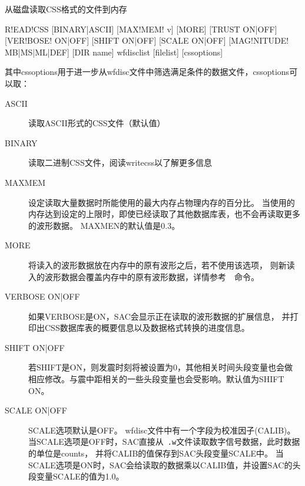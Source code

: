 \label{cmd:readcss}

从磁盘读取CSS格式的文件到内存

\begin{SACSTX}
R!EAD!CSS [BINARY|ASCII] [MAX!MEM! v] [MORE] [TRUST ON|OFF]
    [VER!BOSE! ON|OFF] [SHIFT ON|OFF] [SCALE ON|OFF]
    [MAG!NITUDE! MB|MS|ML|DEF] [DIR name] wfdisclist [filelist]
    [cssoptions]
\end{SACSTX}
其中cssoptions用于进一步从wfdisc文件中筛选满足条件的数据文件，cssoptions可以取：
\begin{SACSTX}
\end{SACSTX}

\begin{description}
\item [ASCII] 读取ASCII形式的CSS文件（默认值）
\item [BINARY] 读取二进制CSS文件，阅读writecss以了解更多信息
\item [MAXMEM] 设定读取大量数据时所能使用的最大内存占物理内存的百分比。
    当使用的内存达到设定的上限时，即使已经读取了其他数据库表，也不会再读取更多的波形数据。
    MAXMEN的默认值是0.3。
\item [MORE] 将读入的波形数据放在内存中的原有波形之后，若不使用该选项，
    则新读入的波形数据会覆盖内存中的原有波形数据，详情参考~~命令。
\item [VERBOSE ON|OFF] 如果VERBOSE是ON，SAC会显示正在读取的波形数据的扩展信息，
    并打印出CSS数据库表的概要信息以及数据格式转换的进度信息。
\item [SHIFT ON|OFF] 若SHIFT是ON，则发震时刻将被设置为0，其他相关时间头段变量也会做
    相应修改。与震中距相关的一些头段变量也会受影响。默认值为SHIFT ON。
\item [SCALE ON|OFF] SCALE选项默认是OFF。
    wfdisc文件中有一个字段为校准因子(CALIB)。
    当SCALE选项是OFF时，SAC直接从~\verb+.w+文件读取数字信号数据，此时数据的单位是counts，
    并将CALIB的值保存到SAC头段变量SCALE中。
    当SCALE选项是ON时，SAC会给读取的数据乘以CALIB值，并设置SAC的头段变量SCALE的值为1.0。

\end{description}
